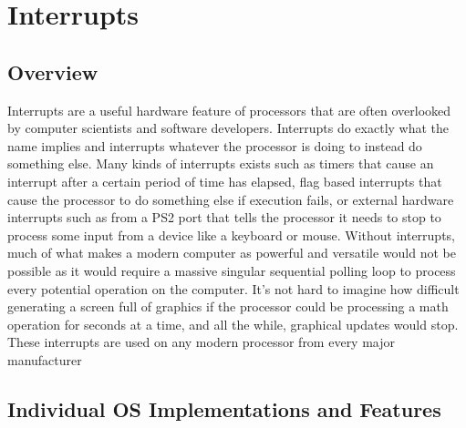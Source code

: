 \section{Interrupts}
\subsection{Overview}
Interrupts are a useful hardware feature of processors that are often overlooked by computer scientists and software developers. Interrupts do exactly what the name implies and interrupts whatever the processor is doing to instead do something else. Many kinds of interrupts exists such as timers that cause an interrupt after a certain period of time has elapsed, flag based interrupts that cause the processor to do something else if execution fails, or external hardware interrupts such as from a PS2 port that tells the processor it needs to stop to process some input from a device like a keyboard or mouse. Without interrupts, much of what makes a modern computer as powerful and versatile would not be possible as it would require a massive singular sequential polling loop to process every potential operation on the computer. It's not hard to imagine how difficult generating a screen full of graphics if the processor could be processing a math operation for seconds at a time, and all the while, graphical updates would stop. These interrupts are used on any modern processor from every major manufacturer 

\subsection{Individual OS Implementations and Features}
